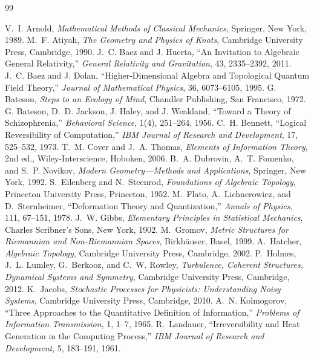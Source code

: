 \documentclass[11pt]{article}
\begin{document}
\begin{thebibliography}{99}

 V.~I. Arnold, \textit{Mathematical Methods of Classical Mechanics}, Springer, New York, 1989.
 M.~F. Atiyah, \textit{The Geometry and Physics of Knots}, Cambridge University Press, Cambridge, 1990.
 J.~C. Baez and J. Huerta, ``An Invitation to Algebraic General Relativity,'' \textit{General Relativity and Gravitation}, 43, 2335--2392, 2011.
 J.~C. Baez and J. Dolan, ``Higher-Dimensional Algebra and Topological Quantum Field Theory,'' \textit{Journal of Mathematical Physics}, 36, 6073--6105, 1995.
 G. Bateson, \textit{Steps to an Ecology of Mind}, Chandler Publishing, San Francisco, 1972.
 G. Bateson, D.~D. Jackson, J. Haley, and J. Weakland, ``Toward a Theory of Schizophrenia,'' \textit{Behavioral Science}, 1(4), 251--264, 1956.
 C.~H. Bennett, ``Logical Reversibility of Computation,'' \textit{IBM Journal of Research and Development}, 17, 525--532, 1973.
 T.~M. Cover and J.~A. Thomas, \textit{Elements of Information Theory}, 2nd ed., Wiley-Interscience, Hoboken, 2006.
 B.~A. Dubrovin, A.~T. Fomenko, and S.~P. Novikov, \textit{Modern Geometry---Methods and Applications}, Springer, New York, 1992.
 S.~Eilenberg and N.~Steenrod, \textit{Foundations of Algebraic Topology}, Princeton University Press, Princeton, 1952.
 M.~Flato, A.~Lichnerowicz, and D.~Sternheimer, ``Deformation Theory and Quantization,'' \textit{Annals of Physics}, 111, 67--151, 1978.
 J.~W. Gibbs, \textit{Elementary Principles in Statistical Mechanics}, Charles Scribner's Sons, New York, 1902.
 M.~Gromov, \textit{Metric Structures for Riemannian and Non-Riemannian Spaces}, Birkh\"auser, Basel, 1999.
 A.~Hatcher, \textit{Algebraic Topology}, Cambridge University Press, Cambridge, 2002.
 P.~Holmes, J.~L. Lumley, G.~Berkooz, and C.~W. Rowley, \textit{Turbulence, Coherent Structures, Dynamical Systems and Symmetry}, Cambridge University Press, Cambridge, 2012.
 K.~Jacobs, \textit{Stochastic Processes for Physicists: Understanding Noisy Systems}, Cambridge University Press, Cambridge, 2010.
 A.~N. Kolmogorov, ``Three Approaches to the Quantitative Definition of Information,'' \textit{Problems of Information Transmission}, 1, 1--7, 1965.
 R.~Landauer, ``Irreversibility and Heat Generation in the Computing Process,'' \textit{IBM Journal of Research and Development}, 5, 183--191, 1961.

\end{thebibliography}
\end{document}
